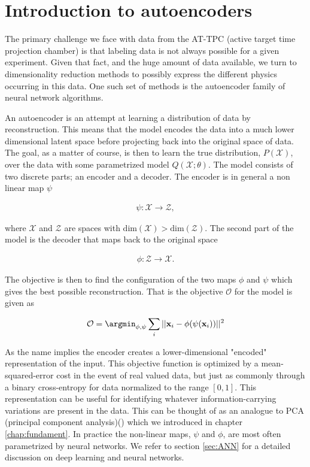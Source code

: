 

\section{Introduction to autoencoders}\label{sec:intro_autoenc}

The primary challenge we face with data from the AT-TPC (active target time projection chamber) is that labeling data is not always possible for a given experiment. Given that fact, and the huge amount of data available, we turn to dimensionality reduction methods to possibly express the different physics occurring in this data. One such set of methods is the autoencoder family of neural network algorithms.

An autoencoder is an attempt at learning a distribution of data by reconstruction. This means that the model encodes the data into a much lower dimensional latent space before projecting back into the original space of data. The goal, as a matter of course, is then to learn the true distribution, $P(\mathcal{X})$, over the data with some parametrized model $Q(\mathcal{X};\theta)$. The model consists of two discrete parts; an encoder and a decoder. The encoder is in general a non linear map $\psi$

\begin{align}
  \psi: \mathcal{X} \rightarrow \mathcal{Z},
\end{align}

\noindent where $\mathcal{X} $ and $\mathcal{Z}$ are spaces with $\text{dim}(\mathcal{X}) > \text{dim}(\mathcal{Z})$.
The second part of the model is the decoder that maps back to the original space

\begin{align}
  \phi: \mathcal{Z} \rightarrow \mathcal{X}.
\end{align}

\noindent The objective is then to find the configuration of the two maps $\phi$ and $\psi$ which gives the best possible reconstruction. That is the objective $\mathcal{O}$ for the model is given as

\begin{align}\label{eq:objective_autoenc}
  \mathcal{O} = \argmin_{\phi, \psi} \sum_i || \mathbf{x}_i - \phi(\psi( \mathbf{x}_i ))  ||^2
\end{align}

\noindent  As the name implies the encoder creates a lower-dimensional "encoded" representation of the input. This objective function is optimized by a mean-squared-error cost in the event of real valued data, but just as commonly through a binary cross-entropy for data normalized to the range $[0, 1]$. This representation can be useful for identifying whatever information-carrying variations are present in the data. This can be thought of as an analogue to PCA (principal component analysis)(\cite{Marsland2009}) which we introduced in chapter \ref{chap:fundament}. In practice the non-linear maps, $\psi$ and $\phi$, are most often parametrized by neural networks. We refer to section \ref{sec:ANN} for a detailed discussion on deep learning and neural networks.

